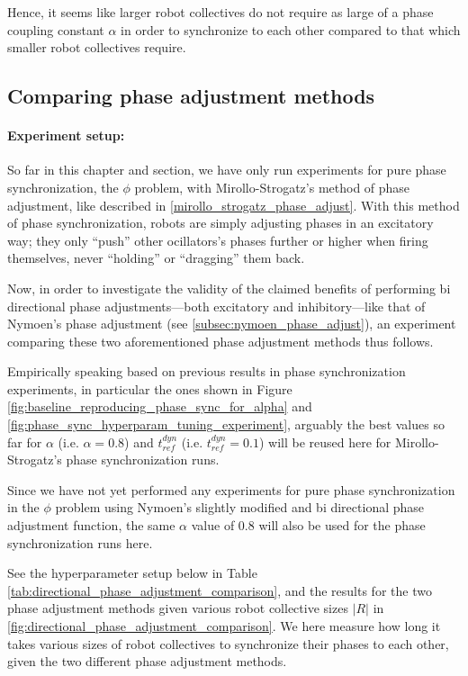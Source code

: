 		Hence, it seems like larger robot collectives do not require as large of a phase coupling constant $\alpha$ in order to synchronize to each other compared to that which smaller robot collectives require.
	
	
	\subsection{Comparing phase adjustment methods}
	
		\paragraph{Experiment setup:\nl}
		
		So far in this chapter and section, we have only run experiments for pure phase synchronization, the $\phi$ problem, with Mirollo-Strogatz's method of phase adjustment, like described in \ref{mirollo_strogatz_phase_adjust}. With this method of phase synchronization, robots are simply adjusting phases in an excitatory way; they only ``push'' other ocillators's phases further or higher when firing themselves, never ``holding'' or ``dragging'' them back.
		
		Now, in order to investigate the validity of the claimed \cite{bi_directional_adj, nymoen_synch} benefits of performing bi directional phase adjustments—both excitatory and inhibitory—like that of Nymoen's phase adjustment (see \ref{subsec:nymoen_phase_adjust}), an experiment comparing these two aforementioned phase adjustment methods thus follows.
		
		Empirically speaking based on previous results in phase synchronization experiments, in particular the ones shown in Figure \ref{fig:baseline_reproducing_phase_sync_for_alpha} and \ref{fig:phase_sync_hyperparam_tuning_experiment}, arguably the best values so far for $\alpha$ (i.e. $\alpha=0.8$) and $t_{ref}^{dyn}$ (i.e. $t_{ref}^{dyn}=0.1$) will be reused here for Mirollo-Strogatz's phase synchronization runs.
		
		Since we have not yet performed any experiments for pure phase synchronization in the $\phi$ problem using Nymoen's slightly modified and bi directional phase adjustment function, the same $\alpha$ value of 0.8 will also be used for the phase synchronization runs here.
		
		See the hyperparameter setup below in Table \ref{tab:directional_phase_adjustment_comparison}, and the results for the two phase adjustment methods given various robot collective sizes $|R|$ in \ref{fig:directional_phase_adjustment_comparison}. We here measure how long it takes various sizes of robot collectives to synchronize their phases to each other, given the two different phase adjustment methods.
		
